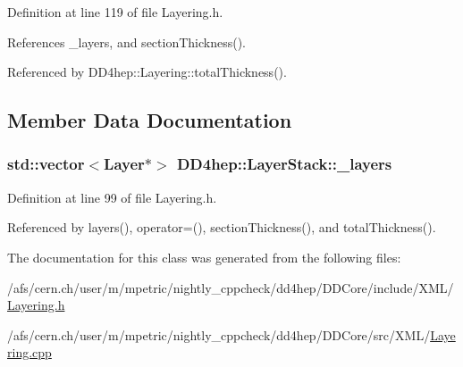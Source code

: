 Definition at line 119 of file Layering.h.

References \_\-layers, and sectionThickness().

Referenced by DD4hep::Layering::totalThickness().

\subsection{Member Data Documentation}
\hypertarget{class_d_d4hep_1_1_layer_stack_a0e07d58da724e44b4d1c77120fb448d0}{
\subsubsection[{\_\-layers}]{\setlength{\rightskip}{0pt plus 5cm}std::vector$<${\bf Layer}$\ast$$>$ {\bf DD4hep::LayerStack::\_\-layers}}}
\label{class_d_d4hep_1_1_layer_stack_a0e07d58da724e44b4d1c77120fb448d0}


Definition at line 99 of file Layering.h.

Referenced by layers(), operator=(), sectionThickness(), and totalThickness().

The documentation for this class was generated from the following files:\begin{DoxyCompactItemize}
\item 
/afs/cern.ch/user/m/mpetric/nightly\_\-cppcheck/dd4hep/DDCore/include/XML/\hyperlink{_layering_8h}{Layering.h}\item 
/afs/cern.ch/user/m/mpetric/nightly\_\-cppcheck/dd4hep/DDCore/src/XML/\hyperlink{_layering_8cpp}{Layering.cpp}\end{DoxyCompactItemize}
